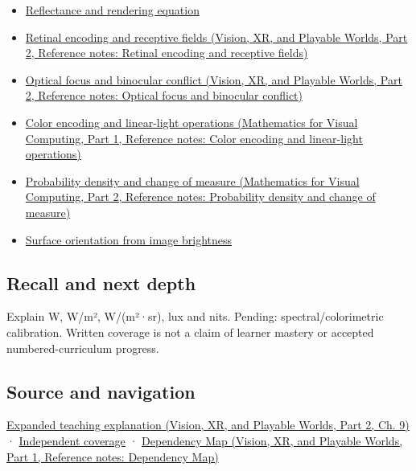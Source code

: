 \begin{itemize}
\tightlist
\item
  \hyperref[appendix-96da0b153b77]{Reflectance and rendering equation}
\item
  \href{../07-Vision-XR-and-Playable-Worlds-P02/main.pdf\#appendix-7281c15ac44a}{Retinal encoding and receptive fields (Vision, XR, and Playable Worlds, Part 2, Reference notes: Retinal encoding and receptive fields)}
\item
  \href{../07-Vision-XR-and-Playable-Worlds-P02/main.pdf\#appendix-f90cee1be7a4}{Optical focus and binocular conflict (Vision, XR, and Playable Worlds, Part 2, Reference notes: Optical focus and binocular conflict)}
\item
  \href{../02-Mathematics-for-Visual-Computing-P01/main.pdf\#appendix-a9f83ad40792}{Color encoding and linear-light operations (Mathematics for Visual Computing, Part 1, Reference notes: Color encoding and linear-light operations)}
\item
  \href{../02-Mathematics-for-Visual-Computing-P02/main.pdf\#appendix-4815cd87ab8b}{Probability density and change of measure (Mathematics for Visual Computing, Part 2, Reference notes: Probability density and change of measure)}
\item
  \hyperref[appendix-89b2d5b7c9e1]{Surface orientation from image brightness}
\end{itemize}

\subsection{Recall and next depth}\label{appendix-215c2570199b-recall-and-next-depth}

\hypertarget{appendix-215c2570199b-recall-and-next-depth}{}

Explain W, W/m², W/(m²·sr), lux and nits. Pending: spectral/colorimetric calibration. Written coverage is not a claim of learner mastery or accepted numbered-curriculum progress.

\subsection{Source and navigation}\label{appendix-215c2570199b-source-and-navigation}

\hypertarget{appendix-215c2570199b-source-and-navigation}{}

\href{../07-Vision-XR-and-Playable-Worlds-P02/main.pdf\#04-visual-computing-ii-ch042-light-must-become-a-quantity-before-it-becomes-a-color}{Expanded teaching explanation (Vision, XR, and Playable Worlds, Part 2, Ch. 9)} · \hyperref[appendix-fd090d982a15-xr01---independent-seeing-and-representation-source]{Independent coverage} · \href{../07-Vision-XR-and-Playable-Worlds-P01/main.pdf\#appendix-4ad47bdd269a}{Dependency Map (Vision, XR, and Playable Worlds, Part 1, Reference notes: Dependency Map)}

